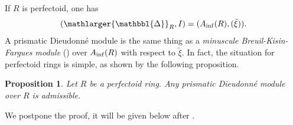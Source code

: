 \documentclass{amsart}
\newcommand{\prism}{{\mathlarger{\mathbbl{\Delta}}}}
\theoremstyle{plain}
\newtheorem{proposition}[theorem]{Proposition}
\newtheorem{lemma}[theorem]{Lemma}
\theoremstyle{definition}
\newcommand{\tilxi}{\tilde{\xi}}
\newcommand{\DM}{\mathrm{DM}}
\newcommand{\DF}{\mathrm{DF}}
\newcommand{\red}[1]{{\color{black} #1}}
\begin{document}
If $R$ is perfectoid, one has $$(\prism_R,I)=(A_{\rm inf}(R),(\tilxi)). $$
A prismatic Dieudonn\'e module is the same thing as a \textit{minuscule Breuil-Kisin-Fargues module} (\cite{bhatt_morrow_scholze_integral_p_adic_hodge_theory}) over $A_{\rm inf}(R)$ with respect to $\tilxi$. In fact, the situation for perfectoid rings is simple, as shown by the following proposition.

\begin{proposition}
  \label{sec:abstr-divid-prism-divided-prismatic-dieudonne-modules-vs-bkf-modules} Let $R$ be a perfectoid ring. Any prismatic Dieudonn\'e module over $R$ is admissible.
  \end{proposition}
 We postpone the proof, it will be given below after .





%  
%
\end{document}
